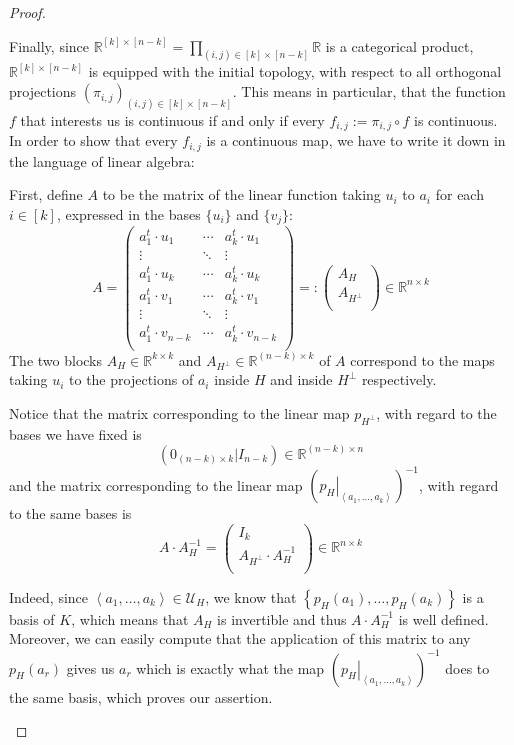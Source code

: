 \begin{proof}
\begin{b_item}
Finally, since $\mathbb{R}^{[k]\times[n-k]}=\prod_{(i,j)\in[k]\times[n-k]}\mathbb{R}$ is a categorical product, $\mathbb{R}^{[k]\times[n-k]}$ is equipped with the initial topology, with respect to all orthogonal projections $\left(\pi_{i,j}\right)_{(i,j)\in[k]\times[n-k]}$. This means in particular, that the function $f$ that interests us is continuous if and only if every $f_{i,j}:=\pi_{i,j}\circ f$ is continuous. In order to show that every $f_{i,j}$ is a continuous map, we have to write it down in the language of linear algebra:

First, define $A$ to be the matrix of the linear function taking $u_i$ to $a_i$ for each $i\in[k]$, expressed in the bases $\{u_i\}$ and $\{v_j\}$:
$$A=\left(\begin{array}{ccc}
a^t_1\cdot u_1&\cdots&a^t_k\cdot u_1\\
\vdots&\ddots&\vdots\\
a^t_1\cdot u_k&\cdots&a^t_k\cdot u_k\\
\hline
a^t_1\cdot v_1&\cdots&a^t_k\cdot v_1\\
\vdots&\ddots&\vdots\\
a^t_1\cdot v_{n-k}&\cdots&a^t_k\cdot v_{n-k}\\
\end{array}\right)=:
\left(\begin{array}{c}A_H\\\hline A_{H^{\perp}}\\
\end{array}\right)
\in\mathbb{R}^{n\times k}$$
The two blocks $A_H\in\mathbb{R}^{k\times k}$ and $A_{H^{\perp}}\in\mathbb{R}^{(n-k)\times k}$ of $A$ correspond to the maps taking $u_i$ to the projections of $a_i$ inside $H$ and inside $H^{\perp}$ respectively.

Notice that the matrix corresponding to the linear map $p_{H^{\perp}}$, with regard to the bases we have fixed is
$$\left(0_{(n-k)\times k}|I_{n-k}\right)\in\mathbb{R}^{(n-k)\times n}$$
and the matrix corresponding to the linear map $\left(\left.p_H\right|_{\left<a_1,\ldots,a_k\right>}\right)^{-1}$, with regard to the same bases is
$$A\cdot A_H^{-1}=\left(\begin{array}{c}I_k\\\hline A_{H^{\perp}}\cdot A_H^{-1}\\\end{array}\right)\in\mathbb{R}^{n\times k}$$

Indeed, since $\left<a_1,\ldots,a_k\right>\in\mathcal{U}_H$, we know that $\left\{p_H(a_1),\ldots,p_H(a_k)\right\}$ is a basis of $K$, which means that $A_H$ is invertible and thus $A\cdot A_H^{-1}$ is well defined. Moreover, we can easily compute that the application of this matrix to any $p_H(a_r)$ gives us $a_r$ which is exactly what the map $\left(\left.p_H\right|_{\left<a_1,\ldots,a_k\right>}\right)^{-1}$ does to the same basis, which proves our assertion.


\end{b_item}
\end{proof}
